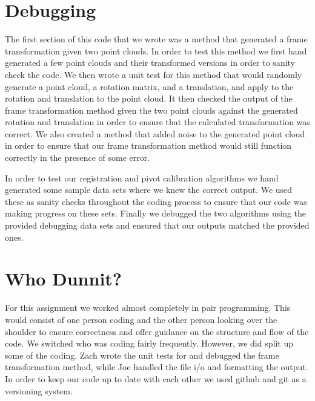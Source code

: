 \documentclass[a4paper]{article}
\begin{document}
\section{Debugging}
The first section of this code that we wrote was a method that generated a frame transformation given two point clouds. In order to test this method we first hand generated a few point clouds and their transformed versions in order to sanity check the code. We then wrote a unit test for this method that would randomly generate a point cloud, a rotation matrix, and a translation, and apply to the rotation and translation to the point cloud. It then checked the output of the frame transformation method given the two point clouds against the generated rotation and translation in order to ensure that the calculated transformation was correct. We also created a method that added noise to the generated point cloud in order to ensure that our frame transformation method would still function correctly in the presence of some error. 

In order to test our registration and pivot calibration algorithms we hand generated some sample data sets where we knew the correct output. We used these as sanity checks throughout the coding process to ensure that our code was making progress on these sets. Finally we debugged the two algorithms using the provided debugging data sets and ensured that our outputs matched the provided ones. 

\section{Who Dunnit?}
For this assignment we worked almost completely in pair programming. This would consist of one person coding and the other person looking over the shoulder to ensure correctness and offer guidance on the structure and flow of the code. We switched who was coding fairly frequently. However, we did split up some of the coding. Zach wrote the unit tests for and debugged the frame transformation method, while Joe handled the file i/o and formatting the output. In order to keep our code up to date with each other we used github and git as a versioning system. 
\end{document}
